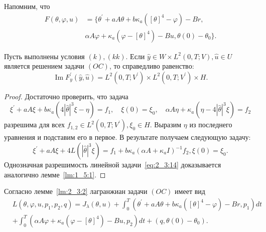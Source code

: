 Напомним, что
\begin{equation*}
    \begin{aligned}
        F(\theta, \varphi, u) &=\{\theta^{\prime}+
        a A \theta+b \kappa_{a}\left([\theta]^{4}-\varphi\right)-B r, \\
        &\alpha A \varphi+\kappa_{a}\left(\varphi-[\theta]^{4}\right)-B u,
        \theta(0)-\theta_{0}\}.
    \end{aligned}
\end{equation*}
\begin{lemma}
    \label{lm:2_3:2}
    Пусть выполнены условия $(k), (kk)$.
    Если $\widehat{y} \in W \times L^{2}(0, T ; V), \widehat{u} \in U$
    является решением задачи $(OC)$, то справедливо равенство:
    \[
        \operatorname{Im} F_{y}^{\prime}
        (\widehat{y}, \widehat{u})=L^{2}\left(0, T; V^{\prime}\right)
        \times L^{2}\left(0, T; V^{\prime}\right) \times H.
    \]
\end{lemma}

\begin{proof}
    Достаточно проверить, что задача
    \[
        \xi^{\prime}+a A \xi+b \kappa_{a}\left(4|\widehat{\theta}|^{3}
        \xi-\eta\right)=f_{1}, \quad \xi(0)=\xi_{0},
        \quad \alpha A \eta+\kappa_{a}\left(\eta-4|\widehat{\theta}|^{3} \xi\right)=f_{2}
    \]
    разрешима для всех $f_{1,2} \in L^{2}\left(0, T; V^{\prime}\right), \xi_{0} \in H$.
    Выразим $\eta$ из последнего уравнения и подставим его в первое.
    В результате получаем следующую задачу:
    \begin{equation}
        \label{eq:2_3:14}
        \xi^{\prime}+a A \xi+4 L\left(|\widehat{\theta}|^{3}
        \xi\right)=f_{1}+b \kappa_{a}\left(\alpha A+\kappa_{a}
        I\right)^{-1} f_{2}, \xi(0)=\xi_{0}.
    \end{equation}
    Однозначная разрешимость линейной задачи~\eqref{eq:2_3:14}
    доказывается аналогично лемме~\ref{lm:1_5:1}.
\end{proof}


Согласно лемме~\ref{lm:2_3:2} лагранжиан задачи $(OC)$ имеет вид
\[
    \begin{aligned}
        & L\left(\theta, \varphi, u, p_{1}, p_{2}, q\right)=
        J_{\lambda}(\theta, u) +\int_{0}^{T}\left(\theta^{\prime}
        + a A \theta+b \kappa_{a}\left([\theta]^{4}-\varphi\right)
        - B r, p_{1}\right) d t \\
        & + \int_{0}^{T}\left(\alpha A \varphi
        + \kappa_{a}\left(\varphi-[\theta]^{4}\right)
        -B u, p_{2}\right) d t+\left(q, \theta(0)-\theta_{0}\right).
    \end{aligned}
\]

